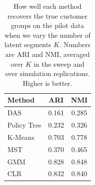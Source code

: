 \begin{table}[htbp]
\centering
\caption{How well each method recovers the true customer groups on the pilot data when we vary the number of latent segments $K$. Numbers are ARI and NMI, averaged over $K$ in the sweep and over simulation replications. Higher is better.}
\label{tab:app-ari-nmi-varying-K-avg}
\begin{tabular}{lcc}
\toprule
Method & ARI & NMI \\
\midrule
DAS & 0.161 & 0.285 \\
Policy Tree & 0.232 & 0.326 \\
K-Means & 0.703 & 0.778 \\
MST & 0.370 & 0.465 \\
GMM & 0.828 & 0.848 \\
CLR & 0.832 & 0.840 \\
\bottomrule
\end{tabular}
\end{table}
